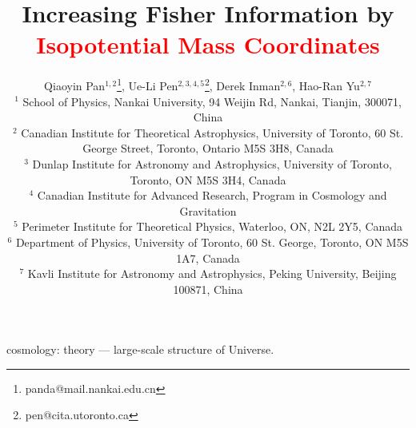 \documentclass[fleqn,useAMS,usenatbib]{mnras}
\newcommand{\tcr}{\textcolor{red}}
\begin{document}
\title[Information increasing by \tcr{Isopotential Mass Coordinates}]
{Increasing Fisher Information by \tcr{Isopotential Mass Coordinates}}
\author[Pan et al.]
{Qiaoyin Pan$^{1,2}$\thanks{panda@mail.nankai.edu.cn},
Ue-Li Pen$^{2,3,4,5}$\thanks{pen@cita.utoronto.ca},
Derek Inman$^{2,6}$,
Hao-Ran Yu$^{2,7}$\\
$^{1}$ School of Physics, Nankai University, 94 Weijin Rd, Nankai, Tianjin, 300071, China\\
$^{2}$ Canadian Institute for Theoretical Astrophysics, University of Toronto, 60 St. George Street, Toronto, Ontario M5S 3H8, Canada\\
$^{3}$ Dunlap Institute for Astronomy and Astrophysics, University of Toronto, Toronto, ON M5S 3H4, Canada\\
$^{4}$ Canadian Institute for Advanced Research, Program in Cosmology and Gravitation\\
$^{5}$ Perimeter Institute for Theoretical Physics, Waterloo, ON, N2L 2Y5, Canada\\
$^{6}$ Department of Physics, University of Toronto, 60 St. George, Toronto, ON M5S 1A7, Canada\\
$^{7}$ Kavli Institute for Astronomy and Astrophysics, Peking University, Beijing 100871, China}

\pagerange{\pageref{firstpage}--\pageref{lastpage}} 
\maketitle
\label{firstpage}



\begin{keywords}
  cosmology: theory --- large-scale structure of Universe.
\end{keywords}
















\bsp	%
\label{lastpage}
\end{document}
